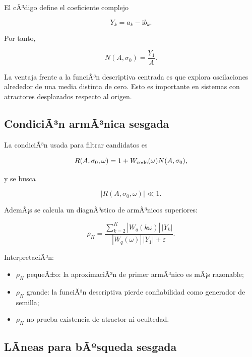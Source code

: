 \documentclass[11pt]{article}
\newcommand{\ii}{\mathrm{i}}
\begin{document}
El cÃ³digo define el coeficiente complejo

\begin{equation}
Y_k=a_k-\ii b_k.
\end{equation}

Por tanto,

\begin{equation}
N(A,\sigma_0)=\frac{Y_1}{A}.
\end{equation}

La ventaja frente a la funciÃ³n descriptiva centrada es que explora oscilaciones alrededor de una media distinta de cero. Esto es importante en sistemas con atractores desplazados respecto al origen.

\subsection{CondiciÃ³n armÃ³nica sesgada}

La condiciÃ³n usada para filtrar candidatos es

\begin{equation}
R(A,\sigma_0,\omega)
=
1+W_{\rm code}(\omega)N(A,\sigma_0),
\end{equation}

y se busca

\begin{equation}
|R(A,\sigma_0,\omega)|\ll 1.
\end{equation}

AdemÃ¡s se calcula un diagnÃ³stico de armÃ³nicos superiores:

\begin{equation}
\rho_H=
\frac{\sum_{k=2}^{K}|W_q(k\omega)|\,|Y_k|}
{|W_q(\omega)|\,|Y_1|+\varepsilon}.
\end{equation}

InterpretaciÃ³n:

\begin{itemize}
\item \(\rho_H\) pequeÃ±o: la aproximaciÃ³n de primer armÃ³nico es mÃ¡s razonable;
\item \(\rho_H\) grande: la funciÃ³n descriptiva pierde confiabilidad como generador de semilla;
\item \(\rho_H\) no prueba existencia de atractor ni ocultedad.
\end{itemize}

\subsection{LÃ­neas para bÃºsqueda sesgada}
\end{document}
